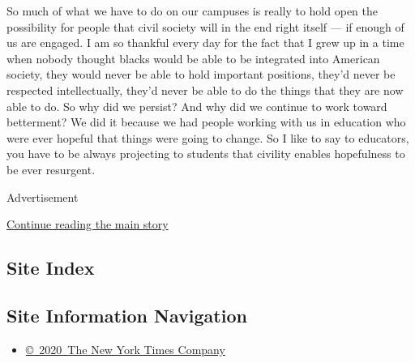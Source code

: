 So much of what we have to do on our campuses is really to hold open the
possibility for people that civil society will in the end right itself
--- if enough of us are engaged. I am so thankful every day for the fact
that I grew up in a time when nobody thought blacks would be able to be
integrated into American society, they would never be able to hold
important positions, they'd never be respected intellectually, they'd
never be able to do the things that they are now able to do. So why did
we persist? And why did we continue to work toward betterment? We did it
because we had people working with us in education who were ever hopeful
that things were going to change. So I like to say to educators, you
have to be always projecting to students that civility enables
hopefulness to be ever resurgent.

Advertisement

\protect\hyperlink{after-bottom}{Continue reading the main story}

\hypertarget{site-index}{%
\subsection{Site Index}\label{site-index}}

\hypertarget{site-information-navigation}{%
\subsection{Site Information
Navigation}\label{site-information-navigation}}

\begin{itemize}
\tightlist
\item
  \href{https://help.nytimes.com/hc/en-us/articles/115014792127-Copyright-notice}{©~2020~The
  New York Times Company}
\end{itemize}

